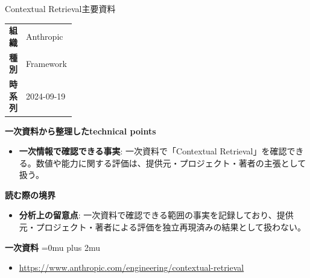 \begin{technicalnote}{Contextual Retrieval}{主要資料}
\begingroup
\begin{tabularx}{\linewidth}{@{}>{\bfseries}p{0.22\linewidth}X@{}}
組織 & Anthropic \\
種別 & Framework \\
時系列 & 2024-09-19 \\
\end{tabularx}
\smallskip
{\bfseries 一次資料から整理したtechnical points}
\begin{itemize}[leftmargin=1.5em,itemsep=0.35em]
\item \textbf{一次情報で確認できる事実}: 一次資料で「Contextual Retrieval」を確認できる。数値や能力に関する評価は、提供元・プロジェクト・著者の主張として扱う。
\end{itemize}
\begin{minipage}{\linewidth}
{\bfseries 読む際の境界}
\begin{itemize}[leftmargin=1.5em,itemsep=0.35em]
\item \textbf{分析上の留意点}: 一次資料で確認できる範囲の事実を記録しており、提供元・プロジェクト・著者による評価を独立再現済みの結果として扱わない。
\end{itemize}
\begin{samepage}
{\bfseries 一次資料}
\begingroup\sloppy
\Urlmuskip=0mu plus 2mu\relax
\begin{itemize}[leftmargin=1.5em,itemsep=0.25em]
\item {\scriptsize\url{https://www.anthropic.com/engineering/contextual-retrieval}}
\end{itemize}
\endgroup
\end{samepage}
\end{minipage}
\endgroup
\end{technicalnote}
\medskip

